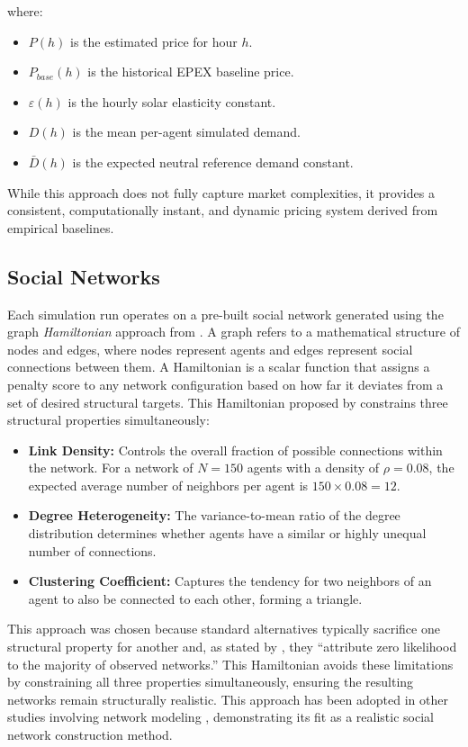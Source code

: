 \documentclass[11pt, a4paper]{article}
\begin{document}
\noindent where:
\begin{itemize}
    \item $P(h)$ is the estimated price for hour $h$.
    \item $P_{base}(h)$ is the historical EPEX baseline price.
    \item $\varepsilon(h)$ is the hourly solar elasticity constant.
    \item $D(h)$ is the mean per-agent simulated demand.
    \item $\bar{D}(h)$ is the expected neutral reference demand constant.
\end{itemize}

While this approach does not fully capture market complexities, it provides a consistent, computationally instant, and dynamic pricing system derived from empirical baselines. 

\subsection{Social Networks} \label{subs:networks}

Each simulation run operates on a pre-built social network generated using the graph \textit{Hamiltonian} approach from \textcite{house_heterogeneous_2014}. A graph refers to a mathematical structure of nodes and edges, where nodes represent agents and edges represent social connections between them. A Hamiltonian is a scalar function that assigns a penalty score to any network configuration based on how far it deviates from a set of desired structural targets. This Hamiltonian proposed by \textcite{house_heterogeneous_2014} constrains three structural properties simultaneously: 
\begin{itemize}
    \item \textbf{Link Density:} Controls the overall fraction of possible connections within the network. For a network of $N = 150$ agents with a density of $\rho = 0.08$, the expected average number of neighbors per agent is $150 \times 0.08 = 12$.
    \item \textbf{Degree Heterogeneity:} The variance-to-mean ratio of the degree distribution determines whether agents have a similar or highly unequal number of connections.
    \item \textbf{Clustering Coefficient:} Captures the tendency for two neighbors of an agent to also be connected to each other, forming a triangle.
\end{itemize} 

This approach was chosen because standard alternatives typically sacrifice one structural property for another and, as stated by \textcite[][p.~1]{house_heterogeneous_2014}, they ``attribute zero likelihood to the majority of observed networks.'' This Hamiltonian avoids these limitations by constraining all three properties simultaneously, ensuring the resulting networks remain structurally realistic. This approach has been adopted in other studies involving network modeling \autocite{reali_simpler_2018,falandays_emergence_2022}, demonstrating its fit as a realistic social network construction method.
\end{document}
